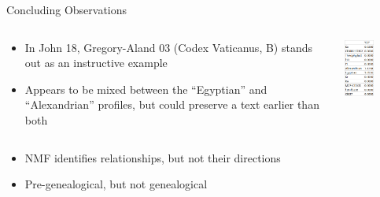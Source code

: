 \documentclass[10pt]{beamer}
\begin{document}
	\begin{frame}{Concluding Observations}
		\begin{columns}[T]
			\begin{column}{0.6\textwidth}
				\begin{itemize}
					\item In John 18, Gregory-Aland 03 (Codex Vaticanus, B) stands out as an instructive example
					\item Appears to be mixed between the ``Egyptian'' and ``Alexandrian'' profiles, but could preserve a text earlier than both
				\end{itemize}
			\end{column}
			\begin{column}{0.3\textwidth}
				\begin{center}
					\includegraphics[width=0.5\textwidth]{../graphics/john_18_03_coefs.png}
				\end{center}
			\end{column}
		\end{columns}
		\begin{itemize}
			\item NMF identifies relationships, but not their directions
			\item Pre-genealogical, but not genealogical
		\end{itemize}
		\begin{center}

\end{center}
\end{frame}
\end{document}
